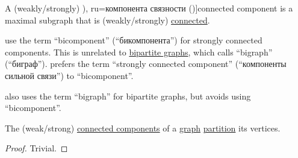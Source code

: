 \begin{definition}\label{def:graph_connected_component}
  A (weakly/strongly) \term[bg=компонента (\cite[15]{Мирчев2001Графи}), ru=компонента связности (\cite[286]{БелоусовТкачёв2004ДискретнаяМатематика})]{connected component} is a maximal subgraph that is (weakly/strongly) \hyperref[def:graph_connectedness]{connected}.
\end{definition}
\begin{comments}
  \item {} use the term \enquote{bicomponent} (\enquote{бикомпонента}) for strongly connected components. This is unrelated to \hyperref[def:multipartite_graph]{bipartite graphs}, which  calls \enquote{bigraph} (\enquote{биграф}).  prefers the term \enquote{strongly connected component} (\enquote{компоненты сильной связи}) to \enquote{bicomponent}.

   also uses the term \enquote{bigraph} for bipartite graphs, but avoids using \enquote{bicomponent}.
\end{comments}

\begin{proposition}\label{thm:connected_components_partition_graph}
  The (weak/strong) \hyperref[def:graph_connected_component]{connected components} of a \hyperref[rem:arbitrary_kind_graph]{graph} \hyperref[def:set_partition]{partition} its vertices.
\end{proposition}
\begin{proof}
  Trivial.
\end{proof}


